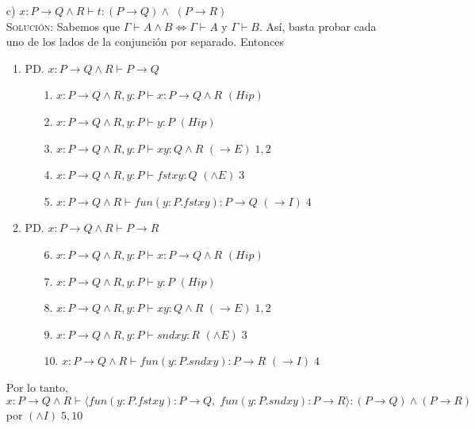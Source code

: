 \documentclass[letterpaper,12pt]{article}
\begin{document}
\begin{enumerate}
    \item[c)] $x: P \rightarrow Q \land R \vdash t: (P \rightarrow Q) \land$
    $(P \rightarrow R)$ \\
    \textsc{Solución:} Sabemos que $\Gamma \vdash A \land B \Leftrightarrow 
    \Gamma \vdash A$ y $\Gamma \vdash B$. Así, basta probar cada uno de los
    lados de la conjunción por separado. Entonces 
    \begin{enumerate}
        \item PD. $x: P \rightarrow Q \land R \vdash P \rightarrow Q$
        \begin{enumerate}
            \item[1.] $x: P \rightarrow Q \land R, y: P \vdash x: P \rightarrow Q \land R$ \; \; \; \; \; $(Hip)$
            \item[2.] $x: P \rightarrow Q \land R, y: P \vdash y: P$ \; \; \; \; \; \; \;  \; \; \; \; \; $(Hip)$
            \item[3.] $x: P \rightarrow Q \land R, y: P \vdash xy: Q \land R$ \; \; \; \; \; \; \; \; $(\rightarrow E) \; 1,2$ 
            \item[4.] $x: P \rightarrow Q \land R, y: P \vdash fst xy: Q$ \; \; \; \; \; \; \; \; \; $(\land E) \; 3$ 
            \item[5.] $x: P \rightarrow Q \land R \vdash fun(y: P.fst xy): P \rightarrow Q$ \; \;$(\rightarrow I) \; 4$   
        \end{enumerate}

        \item PD. $x: P \rightarrow Q \land R \vdash P \rightarrow R$
        \begin{enumerate}
            \item[6.] $x: P \rightarrow Q \land R, y: P \vdash x: P \rightarrow Q \land R$ \; \; \; \; \; $(Hip)$
            \item[7.] $x: P \rightarrow Q \land R, y: P \vdash y: P$ \; \; \; \; \; \; \;  \; \; \; \; \; $(Hip)$
            \item[8.] $x: P \rightarrow Q \land R, y: P \vdash xy: Q \land R$ \; \; \; \; \; \; \; \; $(\rightarrow E) \; 1,2$
            \item[9.] $x: P \rightarrow Q \land R, y: P \vdash snd xy: R$  \; \; \; \; \; \; \; \; \; $(\land E) \; 3$ 
            \item[10.] $x: P \rightarrow Q \land R \vdash fun(y: P.snd xy): P \rightarrow R$ \; \;$(\rightarrow I) \; 4$
        \end{enumerate}
    \end{enumerate}
    Por lo tanto, $x: P \rightarrow Q \land R \vdash \langle fun(y: P.fst xy): P \rightarrow Q, \; 
    fun(y: P.snd xy): P \rightarrow R \rangle : (P \rightarrow Q) \land (P \rightarrow R)$ por $(\land I) \; 5, 10$
\end{enumerate}
\end{document}
